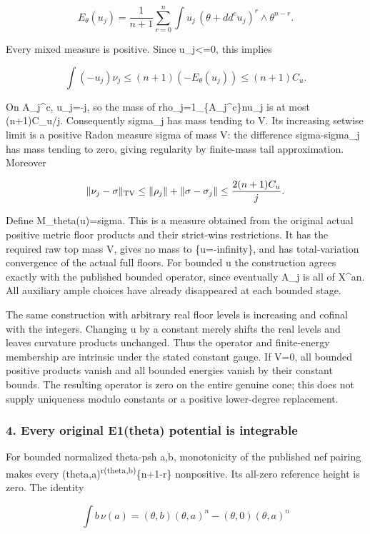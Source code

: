\documentclass[
  10pt,
]{article}
\begin{document}
\[E_\theta(u_j)=\frac1{n+1}\sum_{r=0}^n
\int u_j\,(\theta+dd^cu_j)^r\wedge\theta^{n-r}.\]

Every mixed measure is positive. Since u\_j\textless=0, this implies

\[\int(-u_j)\nu_j\leq(n+1)(-E_\theta(u_j))\leq(n+1)C_u.\]

On A\_j\^{}c, u\_j=-j, so the mass of rho\_j=1\_\{A\_j\^{}c\}nu\_j is at
most (n+1)C\_u/j. Consequently sigma\_j has mass tending to V. Its
increasing setwise limit is a positive Radon measure sigma of mass V:
the difference sigma-sigma\_j has mass tending to zero, giving
regularity by finite-mass tail approximation. Moreover

\[\|\nu_j-\sigma\|_{\rm TV}\leq
\|\rho_j\|+\|\sigma-\sigma_j\|
\leq\frac{2(n+1)C_u}{j}.\]

Define M\_theta(u)=sigma. This is a measure obtained from the original
actual positive metric floor products and their strict-wins
restrictions. It has the required raw top mass V, gives no mass to
\{u=-infinity\}, and has total-variation convergence of the actual full
floors. For bounded u the construction agrees exactly with the published
bounded operator, since eventually A\_j is all of X\^{}an. All auxiliary
ample choices have already disappeared at each bounded stage.

The same construction with arbitrary real floor levels is increasing and
cofinal with the integers. Changing u by a constant merely shifts the
real levels and leaves curvature products unchanged. Thus the operator
and finite-energy membership are intrinsic under the stated constant
gauge. If V=0, all bounded positive products vanish and all bounded
energies vanish by their constant bounds. The resulting operator is zero
on the entire genuine cone; this does not supply uniqueness modulo
constants or a positive lower-degree replacement.

\subsubsection{4. Every original E1(theta) potential is
integrable}\label{every-original-e1theta-potential-is-integrable}

For bounded normalized theta-psh a,b, monotonicity of the published nef
pairing makes every (theta,a)\textsuperscript{r(theta,b)}\{n+1-r\}
nonpositive. Its all-zero reference height is zero. The identity

\[\int b\,\nu(a)=(\theta,b)(\theta,a)^n-(\theta,0)(\theta,a)^n\]
\end{document}
